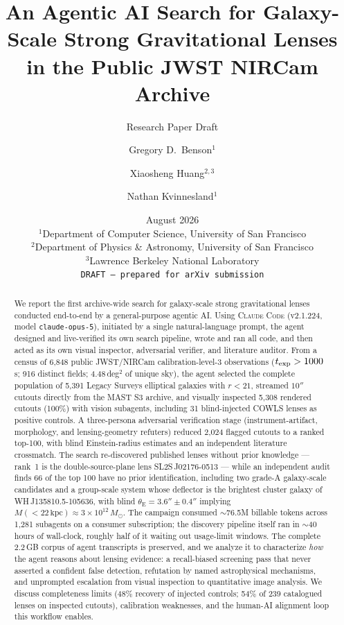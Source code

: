 \documentclass[11pt,letterpaper]{article}
\title{An Agentic AI Search for Galaxy-Scale Strong Gravitational Lenses\\
       in the Public JWST NIRCam Archive}
\author{Gregory D.~Benson$^{1}$ \and Xiaosheng Huang$^{2,3}$ \and Nathan Kvinnesland$^{1}$}
\date{August 2026 \\[2pt]
  {\small $^{1}$Department of Computer Science, University of San Francisco\\
  $^{2}$Department of Physics \& Astronomy, University of San Francisco\\
  $^{3}$Lawrence Berkeley National Laboratory}\\[4pt]
  \texttt{DRAFT — prepared for arXiv submission}}
\newcommand{\thetaE}{\ensuremath{\theta_{\mathrm{E}}}}
\newcommand{\Msun}{\ensuremath{M_\odot}}
\newcommand{\cc}{\textsc{Claude Code}}
\newcommand{\numtargets}{5{,}391}
\newcommand{\numinspected}{5{,}308}
\newcommand{\numflagged}{2{,}024}
\begin{document}
\maketitle
\subtitle{Research Paper Draft}

\begin{abstract}
We report the first archive-wide search for galaxy-scale strong gravitational
lenses conducted end-to-end by a general-purpose agentic AI. Using \cc{}
(v2.1.224, model \texttt{claude-opus-5}), initiated by a single natural-language
prompt, the agent designed and live-verified its own search pipeline, wrote and
ran all code, and then acted as its own visual inspector, adversarial verifier,
and literature auditor. From a census of 6{,}848 public JWST/NIRCam
calibration-level-3 observations ($t_{\rm exp}>1000$\,s; 916 distinct fields;
4.48\,deg$^2$ of unique sky), the agent selected the complete population of
\numtargets{} Legacy Surveys elliptical galaxies with $r<21$, streamed
$10''$ cutouts directly from the MAST S3 archive, and visually inspected
\numinspected{} rendered cutouts (100\%) with vision subagents, including 31
blind-injected COWLS lenses as positive controls. A three-persona adversarial
verification stage (instrument-artifact, morphology, and lensing-geometry
refuters) reduced \numflagged{} flagged cutouts to a ranked top-100, with blind
Einstein-radius estimates and an independent literature crossmatch. The search
re-discovered published lenses without prior knowledge --- rank~1 is the
double-source-plane lens SL2S\,J02176-0513 --- while an independent audit finds
66 of the top 100 have no prior identification, including two grade-A
galaxy-scale candidates and a group-scale system whose deflector is the
brightest cluster galaxy of WH\,J135810.5-105636, with blind
$\thetaE=3.6''\pm0.4''$ implying $M(<22\,\mathrm{kpc})\approx3\times10^{12}\,\Msun$.
The campaign consumed $\sim$76.5M billable tokens across 1{,}281 subagents on
a consumer subscription; the discovery pipeline itself ran in $\sim$40 hours
of wall-clock, roughly half of it waiting out usage-limit windows. The complete 2.2\,GB corpus of agent
transcripts is preserved, and we analyze it to characterize \emph{how} the
agent reasons about lensing evidence: a recall-biased screening pass that never
asserted a confident false detection, refutation by named astrophysical
mechanisms, and unprompted escalation from visual inspection to quantitative
image analysis. We discuss completeness limits (48\% recovery of injected
controls; 54\% of 239 catalogued lenses on inspected cutouts), calibration
weaknesses, and the human-AI alignment loop this workflow enables.
\end{abstract}
\end{document}
